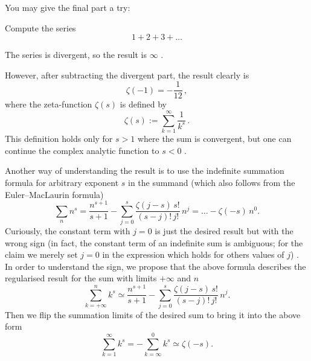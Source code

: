 \documentclass[12pt]{article}
\begin{document}
\begin{sheet}[number=5,label={sheet5}]
\begin{problem}[title={Sums},points=99+4]
You may give the final part a try:

\begin{subproblem}[optional={optional},
  difficulty={requires inspiration},points={+3.5}]
Compute the series
\showpoints
\begin{equation}
1+2+3+\ldots
\end{equation}

\begin{solution}
The series is divergent, so the result is $\infty$ .
\par
However, after subtracting the divergent part,
the result clearly is
\begin{equation}
\zeta(-1)=-\frac{1}{12}\,,
\end{equation}
where the zeta-function $\zeta(s)$ is defined by
\begin{equation}
\zeta(s):=\sum_{k=1}^\infty \frac{1}{k^s}\,.
\end{equation}
This definition holds only for $s>1$ where the sum is convergent,
but one can continue the complex analytic function to $s<0$
.
\par
Another way of understanding the result
is to use the indefinite summation formula
for arbitrary exponent $s$ in the summand
(which also follows from the Euler--MacLaurin formula)
\begin{equation}
\sum_n n^s
= \frac{n^{s+1}}{s+1}
 -\sum_{j=0}^s  \frac{\zeta(j-s)\,s!}{(s-j)!\,j!}\,n^j
= \ldots - \zeta(-s)\,n^0.
\end{equation}
Curiously, the constant term with $j=0$ is just the desired result
but with the wrong sign
(in fact, the constant term of an indefinite sum is ambiguous;
for the claim we merely set $j=0$
in the expression which holds for others values of $j$)
.
In order to understand the sign,
we propose that the above formula describes the regularised result
for the sum with limits $+\infty$ and $n$
\begin{equation}
\sum_{k=+\infty}^n k^s
\simeq \frac{n^{s+1}}{s+1}
 -\sum_{j=0}^s  \frac{\zeta(j-s)\,s!}{(s-j)!\,j!}\,n^j.
\end{equation}
Then we flip the summation limits of the desired sum
to bring it into the above form
\begin{equation}
\sum_{k=1}^\infty k^s
= -\sum_{k=\infty}^0 k^s
\simeq \zeta(-s).
\end{equation}
\end{solution}

\end{subproblem}


\end{problem}
\end{sheet}
\end{document}
